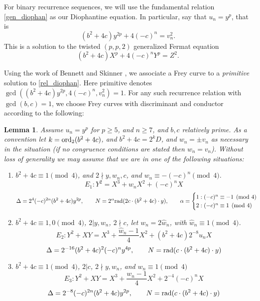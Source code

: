 \documentclass[12pt]{amsart}
\newtheorem{lem}[thm]{Lemma}
\theoremstyle{definition}
\theoremstyle{remark}
\newcommand{\rad}{{\rm{rad}}}
\newcommand{\notdiv}{\nmid}
\newcommand{\ord}{{\rm{ord}}}
\begin{document}
For binary recurrence sequences, we will use the fundamental relation \eqref{gen_diophan} as our Diophantine equation.  In particular, say that $u_n = y^p$, that is
\begin{equation}\label{rel_diophan} (b^2+4c)y^{2p}+4(-c)^n = v_n^2 .\end{equation}
This is a solution to the twisted $(p,p,2)$ generalized Fermat equation
\[ (b^2+4c)X^p +4(-c)^nY^p = Z^2. \]

Using the work of Bennett and Skinner \cite{bennett04}, we associate a Frey curve to a \textit{primitive} solution to \eqref{rel_diophan}.  Here primitive denotes $\gcd((b^2+4c)y^{2p}, 4(-c)^n, v_n^2) = 1$.  For any such recurrence relation with $\gcd(b,c)=1$, we choose Frey curves with discriminant and conductor according to the following:

\begin{lem}\label{freycurves}
Assume $u_n = y^p$ for $p\geq 5$, and $n \geq 7$, and $b,c$ relatively prime.  As a convention let $k = \ord_2(b^2+4c)$,  and $b^2+4c = 2^kD$, and $w_n = \pm v_n$ as necessary in the situation (if no congruence conditions are stated then $w_n = v_n$).  Without loss of generality we may assume that we are in one of the following situations:



\begin{enumerate}[1.]

\item $b^2+4c \equiv 1 \pmod{4}$, and $2 \notdiv y,w_n,c$, and $w_n \equiv -(-c)^n \pmod{4}$.
\vspace{-5pt}
\[ E_1: Y^2 = X^3 + w_nX^2 + (-c)^nX \]
\vspace{-20pt}
\[ \Delta = 2^4(-c)^{2n}(b^2+4c)y^{2p},  \qquad N = 2^{\alpha} \rad(2c \cdot (b^2+4c) \cdot y), \qquad \alpha =  \begin{cases} 1: (-c)^n \equiv -1 \pmod{4}\\ 2 : (-c)^n \equiv 1 \pmod{4} \end{cases} \]

\item $b^2+4c \equiv 1,0 \pmod{4}$, $2|y,w_n$, $2 \notdiv c$, let $w_n = 2\hat{w}_n$, with $\hat{w}_n \equiv 1 \pmod{4}$.
\vspace{-5pt}
\[ E_{2} : Y^2 +XY = X^3 + \frac{\hat{w}_n - 1}{4} X^2 + (b^2+4c)2^{-8}u_nX \]
\vspace{-15pt}
\[ \Delta = 2^{-16}(b^2+4c)^2(-c)^ny^{4p}, \qquad N = \rad( c \cdot (b^2+4c)\cdot y)  \]

\item $b^2+4c \equiv 1 \pmod{4}$, $2|c$, $2 \notdiv y,w_n$, and $w_n \equiv 1 \pmod{4}$
\vspace{-5pt}
\[ E_{3}: Y^2 +XY = X^3 +\frac{w_n-1}{4}X^2 +2^{-4}(-c)^nX \]
\vspace{-15pt}
\[ \Delta = 2^{-8}(-c)^{2n}(b^2+4c)y^{2p} , \qquad N =\rad( c \cdot (b^2+4c)\cdot y)  \]


\end{enumerate}
\end{lem}
\end{document}
